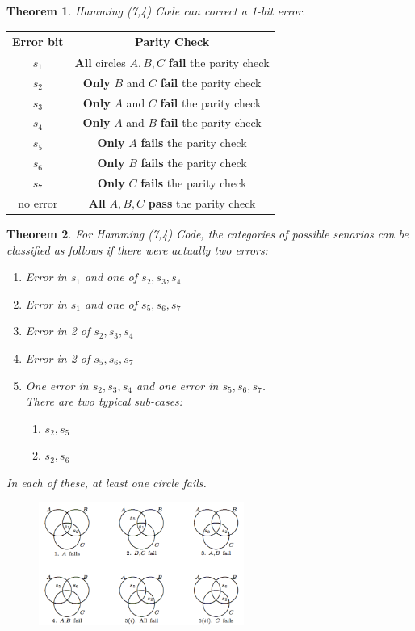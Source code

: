 \documentclass[12pt]{article}
\newtheorem{theorem}{Theorem}[section]
\theoremstyle{definition}
\begin{document}
\begin{theorem}\normalfont Hamming (7,4) Code can correct a 1-bit error.
\end{theorem}\clearpage
\begin{table}[h]
\centering
\begin{tabular}{|c|c|}
\hline
Error bit&Parity Check\\\hline
$s_1$&\textbf{All} circles $A,B,C$ \textbf{fail} the parity check\\\hline
$s_2$&\textbf{Only} $B$ and $C$ \textbf{fail} the parity check\\\hline
$s_3$&\textbf{Only} $A$ and $C$ \textbf{fail} the parity check\\\hline
$s_4$&\textbf{Only} $A$ and $B$ \textbf{fail} the parity check\\\hline
$s_5$&\textbf{Only} $A$ \textbf{fails} the parity check\\\hline
$s_6$&\textbf{Only} $B$ \textbf{fails} the parity check\\\hline
$s_7$&\textbf{Only} $C$ \textbf{fails} the parity check\\\hline
no error&\textbf{All} $A, B, C$ \textbf{pass} the parity check\\\hline
\end{tabular}
\end{table}
\begin{theorem}\normalfont For Hamming (7,4) Code, the categories of possible senarios can be classified as follows if there were actually two errors:
\begin{enumerate}
  \item Error in $s_1$ and one of $s_2, s_3,s_4$
  \item Error in $s_1$ and one of $s_5,s_6,s_7$
  \item Error in 2 of $s_2,s_3,s_4$
  \item Error in 2 of $s_5,s_6,s_7$
  \item One error in $s_2,s_3,s_4$ and one error in $s_5,s_6,s_7$.\\There are two typical sub-cases:
  \begin{enumerate}
    \item $s_2,s_5$
    \item $s_2,s_6$
  \end{enumerate}
\end{enumerate}
In each of these, at least one circle fails.
\begin{figure}[h]
\centering
\includegraphics[width=0.6\textwidth]{4_2.png}
\end{figure}
\end{theorem}
\end{document}
